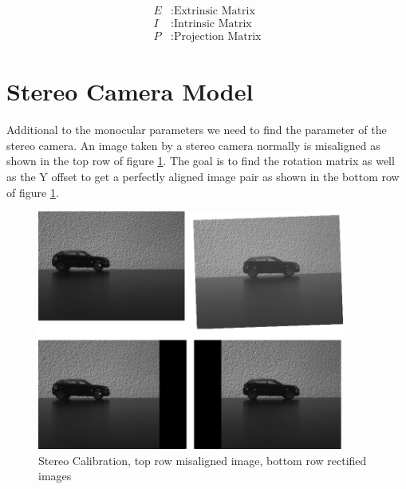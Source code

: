 \documentclass[11pt,a4paper,titlepage,oneside]{report}
\begin{document}
\begin{align*}
	E		&: \text{Extrinsic Matrix}\\
	I		&: \text{Intrinsic Matrix}\\
	P		&: \text{Projection Matrix}
\end{align*}

\section{Stereo Camera Model}

Additional to the monocular parameters we need to find the parameter of the stereo camera. An image taken by a stereo camera normally is misaligned as shown in the top row of figure \ref{fig:stereo_calib}. The goal is to find the rotation matrix as well as the Y offset to get a perfectly aligned image pair as shown in the bottom row of figure \ref{fig:stereo_calib}.

\begin{figure}[H]
  \begin{center}
		\includegraphics[width=0.9\textwidth]{img/stereo_calib.png}
  \end{center}
	\caption{Stereo Calibration, top row misaligned image, bottom row rectified images}\label{fig:stereo_calib}
\end{figure}
\end{document}
